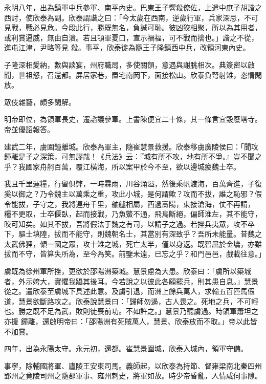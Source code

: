 \begin{pinyinscope}
 永明八年，出為鎮軍中兵參軍、南平內史。巴東王子響殺僚佐，上遣中庶子胡諧之西討，使欣泰為副。欣泰謂諧之曰：「今太歲在西南，逆歲行軍，兵家深忌，不可見戰，戰必見危。今段此行，勝既無名，負誠可恥。彼凶狡相聚，所以為其用者，或利賞逼威，無由自潰。若且頓軍夏口，宣示禍福，可不戰而擒也。」諧之不從，進屯江津，尹略等見
 殺。事平，欣泰徙為隨王子隆鎮西中兵，改領河東內史。



 子隆深相愛納，數與談宴，州府職局，多使關領，意遇與謝朓相次。典簽密以啟聞，世祖怒，召還都。屏居家巷，置宅南岡下，面接松山。欣泰負弩射雉，恣情閑放。



 眾伎雜藝，頗多閑解。



 明帝即位，為領軍長史，遷諮議參軍。上書陳便宜二十條，其一條言宜毀廢塔寺。帝並優詔報答。



 建武二年，虜圍鐘離城。欣泰為軍主，隨崔慧景救援。欣泰移虜廣陵侯曰：「聞攻鐘離是子之深策，可無謬哉！《兵法》云：『城有所不攻，地有所不爭。』豈不聞之乎？我國家舟舸百萬，覆江橫海，所以案甲於今不至，欲以邊城疲魏士卒。



 我且千里運糧，行留俱弊，一時霖雨，川谷涌溢，然後乘帆渡海，百萬齊進，子復奚以御之？乃令魏主以萬乘之重，攻此小城，是何謂歟？攻而不拔，誰之恥邪？假令能拔，子守之，我將連舟千里，舳艫相屬，西過壽陽，東接滄海，仗不再請，
 糧不更取，士卒偃臥，起而接戰，乃魚鱉不通，飛鳥斷絕，偏師淮左，其不能守，晈可知矣。如其不拔，吾將假法于魏之有司，以請子之過。若挫兵夷眾，攻不卒下，驅士填隍，拔而不能守，則魏朝名士，其當別有深致乎？吾所未能量。昔魏之太武佛狸，傾一國之眾，攻十雉之城，死亡太半，僅以身返。既智屈於金墉，亦雖拔而不守，皆算失所為，至今為笑。前鑒未遠，已忘之乎？和門邑邑，戲載往意。」



 虜既為徐州軍所挫，更欲於邵陽洲築城。慧景慮為大患。欣泰曰：「虜所以築城者，外示姱大，實懼我躡其後耳。今若說之以彼此各願罷兵，則其患自息。」慧景從之。遣欣泰至虜城下具述此意。及虜引退，而洲上餘兵萬人，求輸五百匹馬假道，慧景欲斷路攻之。欣泰說慧景曰：「歸師勿遏，古人畏之。死地之兵，不可輕也。勝之既不足為武，敗則徒喪前功。不如許之。」慧景乃聽虜過。時領軍蕭坦之亦援
 鐘離，還啟明帝曰：「邵陽洲有死賊萬人，慧景、欣泰放而不取。」帝以此皆不加賞。



 四年，出為永陽太守。永元初，還都。崔慧景圍城，欣泰入城內，領軍守備。



 事寧，除輔國將軍、廬陵王安東司馬。義師起，以欣泰為持節、督雍梁南北秦四州郢州之竟陵司州之隨郡軍事、雍州刺史，將軍如故。時少帝昏亂，人情咸伺事隙。




\end{pinyinscope}
